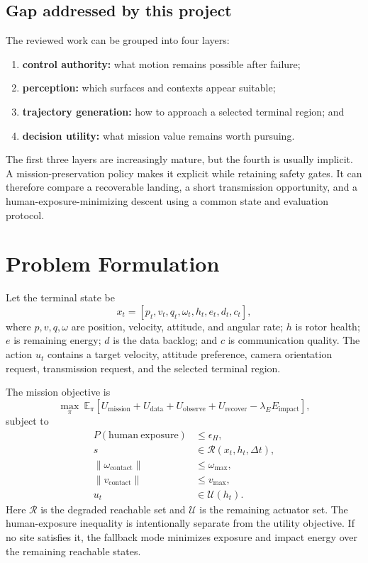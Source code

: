 \documentclass[conference]{IEEEtran}
\begin{document}
\subsection{Gap addressed by this project}
The reviewed work can be grouped into four layers:
\begin{enumerate}
\item \textbf{control authority:} what motion remains possible after failure;
\item \textbf{perception:} which surfaces and contexts appear suitable;
\item \textbf{trajectory generation:} how to approach a selected terminal
region; and
\item \textbf{decision utility:} what mission value remains worth pursuing.
\end{enumerate}
The first three layers are increasingly mature, but the fourth is usually
implicit. A mission-preservation policy makes it explicit while retaining
safety gates. It can therefore compare a recoverable landing, a short
transmission opportunity, and a human-exposure-minimizing descent using a
common state and evaluation protocol.

\section{Problem Formulation}
Let the terminal state be
\begin{equation}
x_t=[p_t,v_t,q_t,\omega_t,h_t,e_t,d_t,c_t],
\end{equation}
where $p,v,q,\omega$ are position, velocity, attitude, and angular rate;
$h$ is rotor health; $e$ is remaining energy; $d$ is the data backlog; and
$c$ is communication quality. The action $u_t$ contains a target velocity,
attitude preference, camera orientation request, transmission request, and
the selected terminal region.

The mission objective is
\begin{equation}
\max_{\pi}\ \mathbb{E}_{\pi}\left[
U_{\mathrm{mission}}+U_{\mathrm{data}}+U_{\mathrm{observe}}
 +U_{\mathrm{recover}}-\lambda_E E_{\mathrm{impact}}\right],
\label{eq:objective}
\end{equation}
subject to
\begin{align}
P(\mathrm{human\ exposure})&\leq \epsilon_H,\\
s&\in\mathcal{R}(x_t,h_t,\Delta t),\\
\|\omega_{\mathrm{contact}}\|&\leq \omega_{\max},\\
\|v_{\mathrm{contact}}\|&\leq v_{\max},\\
u_t&\in\mathcal{U}(h_t).
\end{align}
Here $\mathcal{R}$ is the degraded reachable set and $\mathcal{U}$ is the
remaining actuator set. The human-exposure inequality is intentionally
separate from the utility objective. If no site satisfies it, the fallback
mode minimizes exposure and impact energy over the remaining reachable
states.
\end{document}
